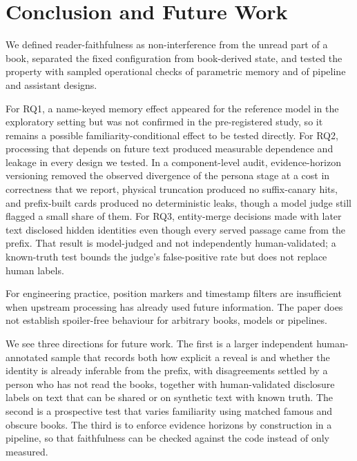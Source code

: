 \documentclass[sn-mathphys]{sn-jnl}%
\theoremstyle{thmstyleone}%
\theoremstyle{thmstyletwo}%
\theoremstyle{thmstylethree}%
\begin{document}
\section{Conclusion and Future Work}\label{sec:conclusion}

We defined reader-faithfulness as non-interference from the unread part of a book, separated the fixed configuration from book-derived state, and tested the property with sampled operational checks of parametric memory and of pipeline and assistant designs.

For RQ1, a name-keyed memory effect appeared for the reference model in the exploratory setting but was not confirmed in the pre-registered study, so it remains a possible familiarity-conditional effect to be tested directly. For RQ2, processing that depends on future text produced measurable dependence and leakage in every design we tested. In a component-level audit, evidence-horizon versioning removed the observed divergence of the persona stage at a cost in correctness that we report, physical truncation produced no suffix-canary hits, and prefix-built cards produced no deterministic leaks, though a model judge still flagged a small share of them. For RQ3, entity-merge decisions made with later text disclosed hidden identities even though every served passage came from the prefix. That result is model-judged and not independently human-validated; a known-truth test bounds the judge's false-positive rate but does not replace human labels.

For engineering practice, position markers and timestamp filters are insufficient when upstream processing has already used future information. The paper does not establish spoiler-free behaviour for arbitrary books, models or pipelines.

We see three directions for future work. The first is a larger independent human-annotated sample that records both how explicit a reveal is and whether the identity is already inferable from the prefix, with disagreements settled by a person who has not read the books, together with human-validated disclosure labels on text that can be shared or on synthetic text with known truth. The second is a prospective test that varies familiarity using matched famous and obscure books. The third is to enforce evidence horizons by construction in a pipeline, so that faithfulness can be checked against the code instead of only measured.
\end{document}
